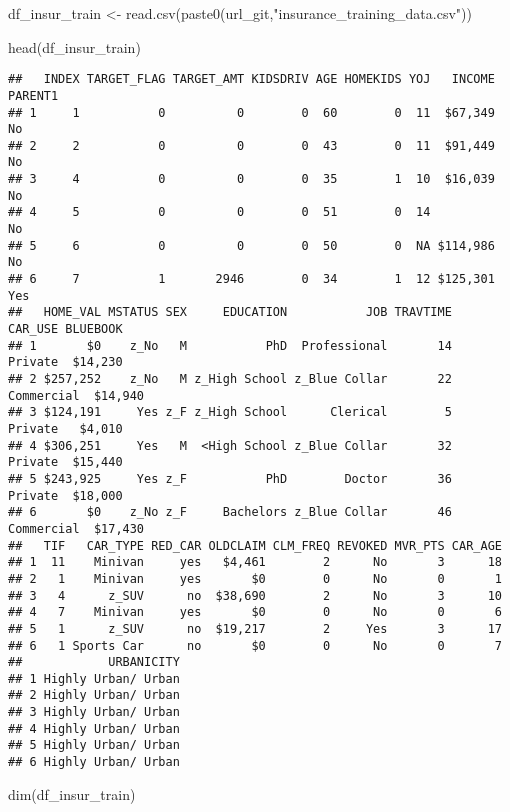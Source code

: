 \documentclass[
]{article}
\newenvironment{Shaded}{\begin{snugshade}}{\end{snugshade}}
\newcommand{\FunctionTok}[1]{\textcolor[rgb]{0.00,0.00,0.00}{#1}}
\newcommand{\NormalTok}[1]{#1}
\newcommand{\OtherTok}[1]{\textcolor[rgb]{0.56,0.35,0.01}{#1}}
\newcommand{\StringTok}[1]{\textcolor[rgb]{0.31,0.60,0.02}{#1}}
\begin{document}
\begin{Shaded}
\begin{Highlighting}[]
\NormalTok{df\_insur\_train }\OtherTok{\textless{}{-}} 
  \FunctionTok{read.csv}\NormalTok{(}\FunctionTok{paste0}\NormalTok{(url\_git,}\StringTok{"insurance\_training\_data.csv"}\NormalTok{))}

\FunctionTok{head}\NormalTok{(df\_insur\_train)}
\end{Highlighting}
\end{Shaded}

\begin{verbatim}
##   INDEX TARGET_FLAG TARGET_AMT KIDSDRIV AGE HOMEKIDS YOJ   INCOME PARENT1
## 1     1           0          0        0  60        0  11  $67,349      No
## 2     2           0          0        0  43        0  11  $91,449      No
## 3     4           0          0        0  35        1  10  $16,039      No
## 4     5           0          0        0  51        0  14               No
## 5     6           0          0        0  50        0  NA $114,986      No
## 6     7           1       2946        0  34        1  12 $125,301     Yes
##   HOME_VAL MSTATUS SEX     EDUCATION           JOB TRAVTIME    CAR_USE BLUEBOOK
## 1       $0    z_No   M           PhD  Professional       14    Private  $14,230
## 2 $257,252    z_No   M z_High School z_Blue Collar       22 Commercial  $14,940
## 3 $124,191     Yes z_F z_High School      Clerical        5    Private   $4,010
## 4 $306,251     Yes   M  <High School z_Blue Collar       32    Private  $15,440
## 5 $243,925     Yes z_F           PhD        Doctor       36    Private  $18,000
## 6       $0    z_No z_F     Bachelors z_Blue Collar       46 Commercial  $17,430
##   TIF   CAR_TYPE RED_CAR OLDCLAIM CLM_FREQ REVOKED MVR_PTS CAR_AGE
## 1  11    Minivan     yes   $4,461        2      No       3      18
## 2   1    Minivan     yes       $0        0      No       0       1
## 3   4      z_SUV      no  $38,690        2      No       3      10
## 4   7    Minivan     yes       $0        0      No       0       6
## 5   1      z_SUV      no  $19,217        2     Yes       3      17
## 6   1 Sports Car      no       $0        0      No       0       7
##            URBANICITY
## 1 Highly Urban/ Urban
## 2 Highly Urban/ Urban
## 3 Highly Urban/ Urban
## 4 Highly Urban/ Urban
## 5 Highly Urban/ Urban
## 6 Highly Urban/ Urban
\end{verbatim}

\begin{Shaded}
\begin{Highlighting}[]
\FunctionTok{dim}\NormalTok{(df\_insur\_train)}
\end{Highlighting}
\end{Shaded}
\end{document}
